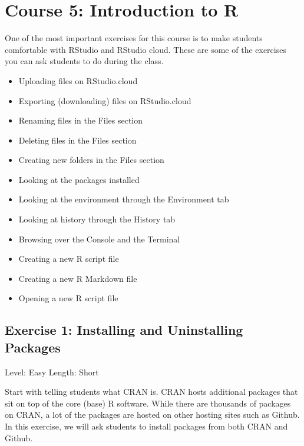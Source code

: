 \documentclass[]{book}
\providecommand{\tightlist}{%
  \setlength{\itemsep}{0pt}\setlength{\parskip}{0pt}}
\begin{document}
\hypertarget{intro-r}{%
\chapter*{Course 5: Introduction to R}\label{intro-r}}

One of the most important exercises for this course is to make students comfortable with RStudio and RStudio cloud. These are some of the exercises you can ask students to do during the class.

\begin{itemize}
\tightlist
\item
  Uploading files on RStudio.cloud
\item
  Exporting (downloading) files on RStudio.cloud
\item
  Renaming files in the Files section
\item
  Deleting files in the Files section
\item
  Creating new folders in the Files section
\item
  Looking at the packages installed
\item
  Looking at the environment through the Environment tab
\item
  Looking at history through the History tab
\item
  Browsing over the Console and the Terminal
\item
  Creating a new R script file
\item
  Creating a new R Markdown file
\item
  Opening a new R script file
\end{itemize}

\hypertarget{exercise-1-installing-and-uninstalling-packages}{%
\section*{Exercise 1: Installing and Uninstalling Packages}\label{exercise-1-installing-and-uninstalling-packages}}

Level: Easy
Length: Short

Start with telling students what CRAN is. CRAN hosts additional packages that sit on top of the core (base) R software. While there are thousands of packages on CRAN, a lot of the packages are hosted on other hosting sites such as Github. In this exercise, we will ask students to install packages from both CRAN and Github.
\end{document}
